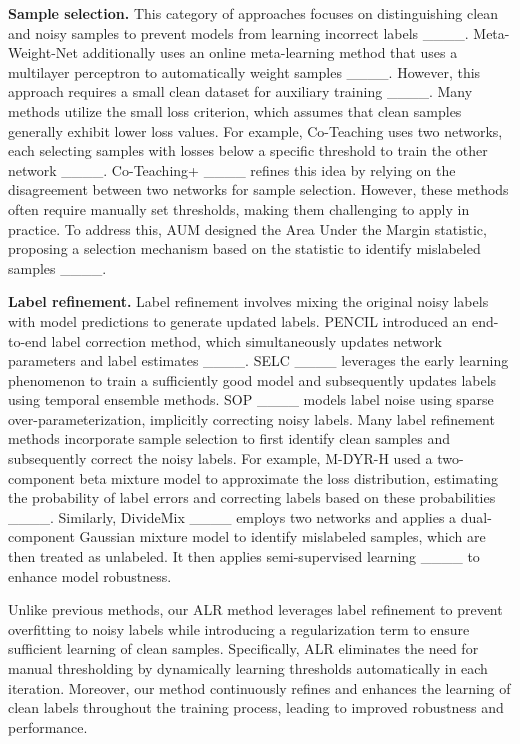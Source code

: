 \textbf{Sample selection.} This category of approaches focuses on distinguishing clean and noisy samples to prevent models from learning incorrect labels ____. Meta-Weight-Net additionally uses an online meta-learning method that uses a multilayer perceptron to automatically weight samples ____. However, this approach requires a small clean dataset for auxiliary training ____. Many methods utilize the small loss criterion, which assumes that clean samples generally exhibit lower loss values. For example, Co-Teaching uses two networks, each selecting samples with losses below a specific threshold to train the other network ____. Co-Teaching+ ____ refines this idea by relying on the disagreement between two networks for sample selection. However, these methods often require manually set thresholds, making them challenging to apply in practice. To address this, AUM designed the Area Under the Margin statistic, proposing a selection mechanism based on the statistic to identify mislabeled samples ____. 

\textbf{Label refinement.} Label refinement involves mixing the original noisy labels with model predictions to generate updated labels. PENCIL introduced an end-to-end label correction method, which simultaneously updates network parameters and label estimates ____. SELC ____ leverages the early learning phenomenon to train a sufficiently good model and subsequently updates labels using temporal ensemble methods. SOP ____ models label noise using sparse over-parameterization, implicitly correcting noisy labels. Many label refinement methods incorporate sample selection to first identify clean samples and subsequently correct the noisy labels. For example, M-DYR-H used a two-component beta mixture model to approximate the loss distribution, estimating the probability of label errors and correcting labels based on these probabilities ____. Similarly, DivideMix ____ employs two networks and applies a dual-component Gaussian mixture model to identify mislabeled samples, which are then treated as unlabeled. It then applies semi-supervised learning ____ to enhance model robustness.

Unlike previous methods, our ALR method leverages label refinement to prevent overfitting to noisy labels while introducing a regularization term to ensure sufficient learning of clean samples. Specifically, ALR eliminates the need for manual thresholding by dynamically learning thresholds automatically in each iteration. Moreover, our method continuously refines and enhances the learning of clean labels throughout the training process, leading to improved robustness and performance.